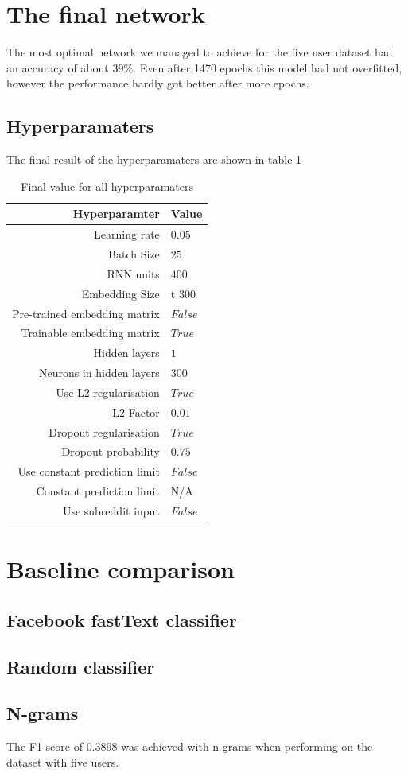 \section{The final network}
The most optimal network we managed to achieve for the five user dataset had an accuracy of about $39\%$. Even after 1470 epochs this model had not overfitted, however the performance hardly got better after more epochs.

\subsection{Hyperparamaters}
The final result of the hyperparamaters are shown in table \ref{table:hyperparameters_final}

\begin{table}[h!]
    \centering
    \begin{tabular}{ r  p{7cm} }
        \hline
        \textbf{Hyperparamter}  &  \textbf{Value} \\ \hline \hline
        Learning rate & $0.05$  \\ \hline
        Batch Size & $25$ \\ \hline
        RNN units & $400$  \\ \hline
        Embedding Size & t $300$ \\ \hline
        Pre-trained embedding matrix & $False$ \\ \hline
        Trainable embedding matrix & $True$ \\ \hline
        Hidden layers & $1$ \\ \hline
        Neurons in hidden layers & $300$ \\ \hline
        Use L2 regularisation & $True$ \\ \hline
        L2 Factor & $0.01$ \\ \hline
        Dropout regularisation & $True$\\ \hline
        Dropout probability & $0.75$ \\ \hline
        Use constant prediction limit & $False$ \\ \hline
        Constant prediction limit & N/A  \\ \hline
        Use subreddit input & $False$ \\ \hline
    \end{tabular}
    \caption{Final value for all hyperparamaters}
    \label{table:hyperparameters_final}
\end{table}
\section{Baseline comparison} 
\subsection{Facebook fastText classifier}

\subsection{Random classifier}

\subsection{N-grams}
The F1-score of $0.3898$ was achieved with n-grams when performing on the dataset with five users.

